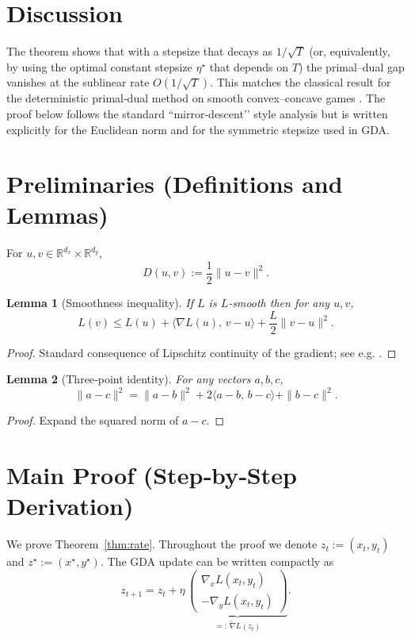 \documentclass{article}
\newtheorem{lemma}{Lemma}
\newcommand{\R}{\mathbb{R}}
\begin{document}
\section*{Discussion}
The theorem shows that with a stepsize that decays as $1/\sqrt{T}$ (or, equivalently, by using the optimal constant stepsize $\eta^\star$ that depends on $T$) the primal–dual gap vanishes at the sublinear rate $O(1/\sqrt{T})$. This matches the classical result for the deterministic primal‑dual method on smooth convex–concave games \cite{nemirovski2004prox}. The proof below follows the standard “mirror‑descent’’ style analysis but is written explicitly for the Euclidean norm and for the symmetric stepsize used in GDA.

\newpage
\section*{Preliminaries (Definitions and Lemmas)}
\begin{definition}
For $u,v\in\R^{d_x}\times\R^{d_y}$,
\[
    D(u,v):=\frac12\|u-v\|^2 .
\]
\end{definition}

\begin{lemma}[Smoothness inequality]\label{lem:smooth}
If $L$ is $L$‑smooth then for any $u,v$,
\[
    L(v) \le L(u) + \langle \nabla L(u),\,v-u\rangle + \frac{L}{2}\|v-u\|^2 .
\tag{3}
\]
\end{lemma}
\begin{proof}
Standard consequence of Lipschitz continuity of the gradient; see e.g. \cite{nesterov2004introductory}.
\end{proof}

\begin{lemma}[Three‑point identity]\label{lem:three}
For any vectors $a,b,c$,
\[
    \|a-c\|^2 = \|a-b\|^2 + 2\langle a-b,\,b-c\rangle + \|b-c\|^2 .
\tag{4}
\]
\end{lemma}
\begin{proof}
Expand the squared norm of $a-c$.
\end{proof}

\newpage
\section*{Main Proof (Step‑by‑Step Derivation)}
We prove Theorem~\ref{thm:rate}. Throughout the proof we denote $z_t:=(x_t,y_t)$ and $z^\star:=(x^\star,y^\star)$. The GDA update can be written compactly as
\[
    z_{t+1}=z_t + \eta\,\underbrace{ \begin{pmatrix}
        \nabla_x L(x_t,y_t)\\[2pt]
        -\nabla_y L(x_t,y_t)
    \end{pmatrix}}_{=:\,\tilde\nabla L(z_t)} .
\tag{5}
\]
\end{document}
